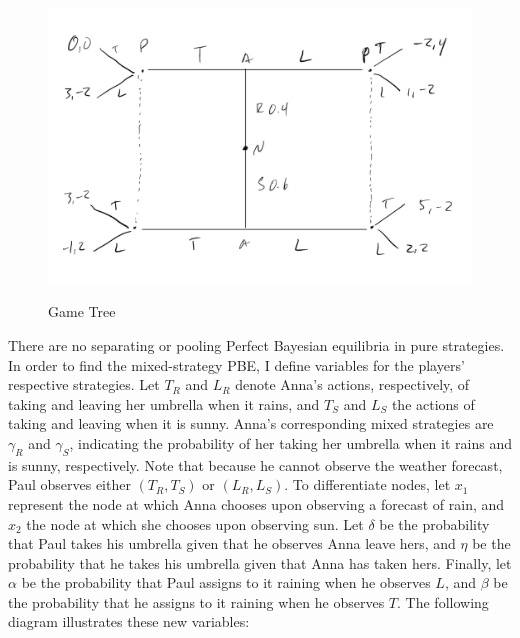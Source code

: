 \documentclass[11pt]{article}
\begin{document}
\begin{enumerate}
	\begin{figure}[!h]
		\centering
		\caption{Game Tree}
		\includegraphics[scale=0.6]{fig_3_tree}
		\label{fig3}
	\end{figure}


	There are no separating or pooling Perfect Bayesian equilibria in pure strategies. In order to find the mixed-strategy PBE, I define variables for the players' respective strategies. Let $ T_R $ and $ L_R $ denote Anna's actions, respectively, of taking and leaving her umbrella when it rains, and $ T_S $ and $ L_S $ the actions of taking and leaving when it is sunny. Anna's corresponding mixed strategies are $ \gamma_R $ and $\gamma_S$, indicating the probability of her taking her umbrella when it rains and is sunny, respectively. Note that because he cannot observe the weather forecast, Paul observes either $ (T_R, T_S) $ or $ (L_R, L_S) $. To differentiate nodes, let $ x_1 $ represent the node at which  Anna chooses upon observing a forecast of rain, and $ x_2 $ the node at which she chooses upon observing sun. Let $ \delta $ be the probability that Paul takes his umbrella given that he observes Anna leave hers, and $ \eta $ be the probability that he takes his umbrella given that Anna has taken hers. Finally, let $\alpha$ be the probability that Paul assigns to it raining when he observes $ L $, and $\beta$ be the probability that he assigns to it raining when he observes $ T $. The following diagram illustrates these new variables: \newpage
	

\end{enumerate}
\end{document}
